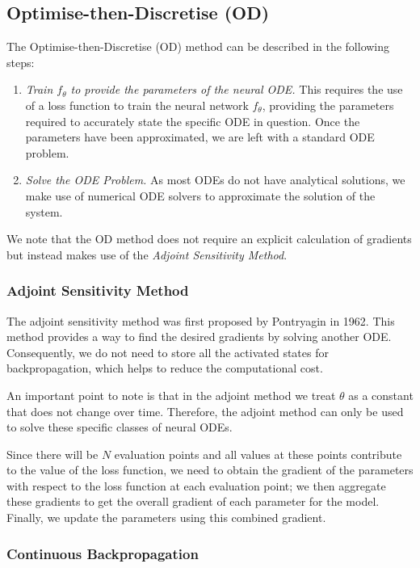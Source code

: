 \documentclass[a4paper,11pt,titlepage]{article}
\theoremstyle{definition}
\theoremstyle{plain}
\theoremstyle{remark}
\begin{document}
\subsection{Optimise-then-Discretise (OD)}
\label{sec:od}

The Optimise-then-Discretise (OD) method can be described in the following steps:
\begin{enumerate}
    \item \textit{Train $f_\theta$ to provide the parameters of the neural ODE.} This requires the use of a loss function to train the neural network $f_\theta$, providing the parameters required to accurately state the specific ODE in question. Once the parameters have been approximated, we are left with a standard ODE problem.
    \item \textit{Solve the ODE Problem.} As most ODEs do not have analytical solutions, we make use of numerical ODE solvers to approximate the solution of the system.
\end{enumerate}

We note that the OD method does not require an explicit calculation of gradients but instead makes use of the \textit{Adjoint Sensitivity Method}.

\subsubsection{Adjoint Sensitivity Method}

The adjoint sensitivity method was first proposed by Pontryagin in 1962. This method provides a way to find the desired gradients by solving another ODE. Consequently, we do not need to store all the activated states for backpropagation, which helps to reduce the computational cost. 

An important point to note is that in the adjoint method we treat $\theta$ as a constant that does not change over time. Therefore, the adjoint method can only be used to solve these specific classes of neural ODEs.

Since there will be $N$ evaluation points and all values at these points contribute to the value of the loss function, we need to obtain the gradient of the parameters with respect to the loss function at each evaluation point; we then aggregate these gradients to get the overall gradient of each parameter for the model. Finally, we update the parameters using this combined gradient.

\subsubsection{Continuous Backpropagation}
\label{sec:contback}
\end{document}
